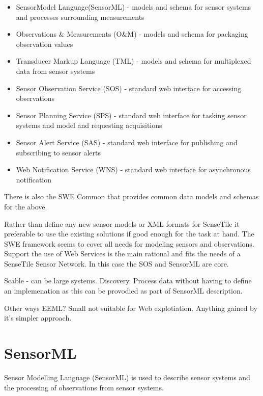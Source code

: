 \documentclass[]{final_report}
\begin{document}
\begin{itemize}
\item  SensorModel Language(SensorML) - models and schema for sensor systems and processes surrounding measurements
\item  Observations \& Measurements (O\&M) - models and schema for packaging observation values
\item  Transducer Markup Language (TML) - models and schema for multiplexed data from sensor systems
\item  Sensor Observation Service (SOS) - standard web interface for accessing observations
\item  Sensor Planning Service (SPS) - standard web interface for tasking sensor systems and model and requesting acquisitions
\item   Sensor Alert Service (SAS) - standard web interface for publishing and subscribing to sensor alerts
\item   Web Notification Service (WNS) - standard web interface for asynchronous notification
\end{itemize}
There is also the SWE Common that provides common data models and schemas for the above.

Rather than define any new sensor models or XML formats for SenseTile it preferable to use the existing solutions if good enough for the task at hand. The SWE framework seems to cover all needs for modeling sensors and observations. Support the use of Web Services is the main rational and fits the needs of a SenseTile Sensor Network. In this case the SOS and SensorML are core.

Scable - can be  large systems. Discovery. Process data without having to define an implemenation as this
can be provodied as part of SensorML description.

Other ways EEML? Small not suitable for Web explotiation. Anything gained by it's simpler approach.

\section{SensorML}
Sensor Modelling Language (SensorML) is used to describe sensor systems and the processing of observations from sensor systems.
\end{document}
